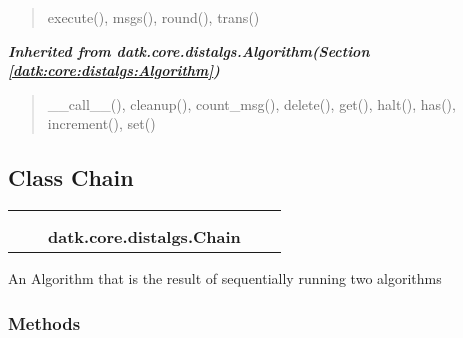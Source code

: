 \begin{quote}
execute(), msgs(), round(), trans()
\end{quote}

\large{\textbf{\textit{Inherited from datk.core.distalgs.Algorithm\textit{(Section \ref{datk:core:distalgs:Algorithm})}}}}

\begin{quote}
\_\_call\_\_(), cleanup(), count\_msg(), delete(), get(), halt(), has(), increment(), set()
\end{quote}


\subsection{Class Chain}

    \label{datk:core:distalgs:Chain}
\begin{tabular}{cccccc}
\multicolumn{2}{r}{\settowidth{\BCL}{datk.core.distalgs.Algorithm}\multirow{2}{\BCL}{datk.core.distalgs.Algorithm}}
&&
  \\\cline{3-3}
  &&\multicolumn{1}{c|}{}
&&
  \\
&&\multicolumn{2}{l}{\textbf{datk.core.distalgs.Chain}}
\end{tabular}

An Algorithm that is the result of sequentially running two algorithms



  \subsubsection{Methods}

    \vspace{0.5ex}

